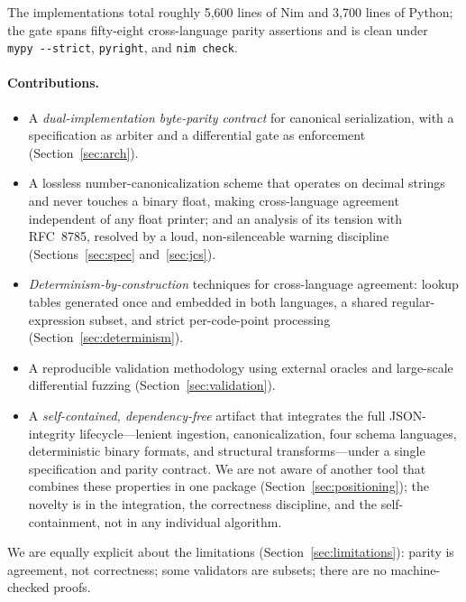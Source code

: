 \documentclass[11pt]{article}
\newcommand{\code}[1]{\texttt{#1}}
\begin{document}
The implementations total roughly 5{,}600 lines of Nim and 3{,}700 lines of
Python; the gate spans fifty-eight cross-language parity assertions and is clean under
\code{mypy~-{}-strict}, \code{pyright}, and \code{nim~check}.

\paragraph{Contributions.}
\begin{itemize}[leftmargin=1.4em,itemsep=2pt]
  \item A \emph{dual-implementation byte-parity contract} for canonical
        serialization, with a specification as arbiter and a differential gate
        as enforcement (Section~\ref{sec:arch}).
  \item A lossless number-canonicalization scheme that operates on decimal
        strings and never touches a binary float, making cross-language
        agreement independent of any float printer; and an analysis of its
        tension with RFC~8785, resolved by a loud, non-silenceable warning
        discipline (Sections~\ref{sec:spec} and~\ref{sec:jcs}).
  \item \emph{Determinism-by-construction} techniques for cross-language
        agreement: lookup tables generated once and embedded in both languages,
        a shared regular-expression subset, and strict per-code-point processing
        (Section~\ref{sec:determinism}).
  \item A reproducible validation methodology using external oracles and
        large-scale differential fuzzing (Section~\ref{sec:validation}).
  \item A \emph{self-contained, dependency-free} artifact that integrates the
        full JSON-integrity lifecycle---lenient ingestion, canonicalization, four
        schema languages, deterministic binary formats, and structural
        transforms---under a single specification and parity contract.
        We are not aware of another tool that combines these properties in one
        package (Section~\ref{sec:positioning}); the novelty is in the
        integration, the correctness discipline, and the self-containment,
        not in any individual algorithm.
\end{itemize}

We are equally explicit about the limitations (Section~\ref{sec:limitations}):
parity is agreement, not correctness; some validators are subsets; there are no
machine-checked proofs.
\end{document}
